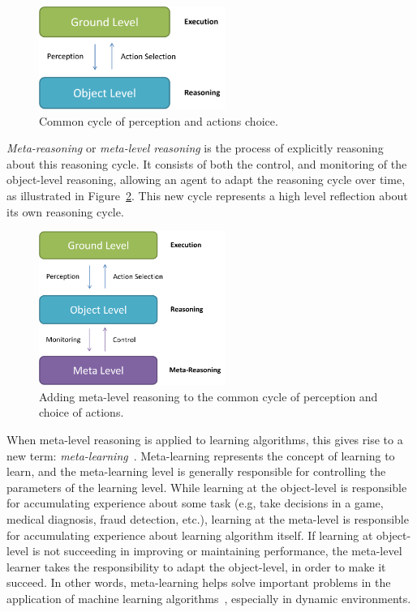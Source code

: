 \begin{figure}[ht]
\centering
\includegraphics[width=230px]{images/reasoning}
\caption{Common cycle of perception and actions choice.}
\label{fig:reasoning}
\end{figure}

\textit{Meta-reasoning} or \textit{meta-level reasoning} is the process of explicitly reasoning about this reasoning cycle. 
It consists of both the control, and monitoring of the object-level reasoning, allowing an agent to adapt the reasoning cycle over time, as illustrated in Figure~\ref{fig:metareasoning}. 
This new cycle represents a high level reflection about its own reasoning cycle. 

\begin{figure}[ht]
\centering
\includegraphics[width=230px]{images/metareasoning}
\caption{Adding meta-level reasoning to the common cycle of perception and choice of actions.}
\label{fig:metareasoning}
\end{figure}

When meta-level reasoning is applied to learning algorithms, this gives rise to a new term: \textit{meta-learning}~\cite{schweighofer2003meta, doya2002metalearning}.
Meta-learning represents the concept of learning to learn, and the meta-learning level is generally responsible for controlling the parameters of the learning level.
While learning at the object-level is responsible for accumulating experience about some task (e.g, take decisions in a game, medical diagnosis, fraud detection, etc.), learning at the meta-level is responsible for accumulating experience about learning algorithm itself. 
If learning at object-level is not succeeding in improving or maintaining performance, the meta-level learner takes the responsibility to adapt the object-level, in order to make it succeed.
In other words, meta-learning helps solve important problems in the application of machine learning algorithms~\cite{vilalta2004using}, especially in dynamic environments.